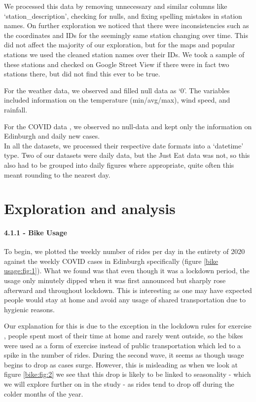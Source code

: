 \documentclass[11pt,a4paper]{article}
\begin{document}
We processed this data by removing unnecessary and similar columns like ‘station\_description’, checking for nulls, and fixing spelling mistakes in station names. On further exploration we noticed that there were inconsistencies such as the coordinates and IDs for the seemingly same station changing over time. This did not affect the majority of our exploration, but for the maps and popular stations we used the cleaned station names over their IDs. We took a sample of these stations and checked on Google Street View if there were in fact two stations there, but did not find this ever to be true.

For the weather data\cite{Meteostat}, we observed and filled null data as ‘0’. The variables included information on the temperature (min/avg/max), wind speed, and rainfall. 

For the COVID data \cite{PHS}, we observed no null-data and kept only the information on Edinburgh and daily new cases.\\

In all the datasets, we processed their respective date formats into a ‘datetime’ type. Two of our datasets were daily data, but the Just Eat data was not, so this also had to be grouped into daily figures where appropriate, quite often this meant rounding to the nearest day.

\section{Exploration and  analysis}
\paragraph{4.1.1 - Bike Usage}

To begin, we plotted the weekly number of rides per day in the entirety of 2020 against the weekly COVID cases in Edinburgh specifically (figure \ref{bike usage:fig:1}). What we found was that even though it was a lockdown period, the usage only minutely dipped when it was first announced but sharply rose afterward and throughout lockdown. This is interesting as one may have expected people would stay at home and avoid any usage of shared transportation due to hygienic reasons. 

Our explanation for this is due to the exception in the lockdown rules for exercise \cite{NHS}, people spent most of their time at home and rarely went outside, so the bikes were used as a form of exercise instead of public transportation which led to a spike in the number of rides. During the second wave, it seems as though usage begins to drop as cases surge. However, this is misleading as when we look at figure \ref{bike:fig:2} we see that this drop is likely to be linked to seasonality - which we will explore further on in the study - as rides tend to drop off during the colder months of the year.
\end{document}
